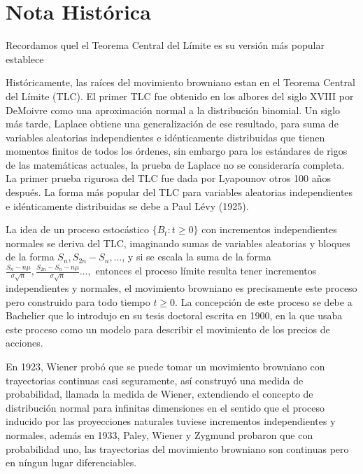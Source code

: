 \documentclass[12pt, letterpaper]{article}
\numberwithin{equation}{section}
\begin{document}

\tableofcontents


\pagebreak
\setcounter{page}{1}

\section{Nota Histórica}

Recordamos quel el Teorema Central del Límite es su versión más popular establece 

Históricamente, las raíces del movimiento browniano estan en el Teorema Central del Límite (TLC). El primer TLC fue obtenido en los albores del siglo XVIII por DeMoivre como una aproximación normal a la distribución binomial. Un siglo más tarde, Laplace obtiene una generalización de ese resultado, para suma de variables aleatorias independientes e idénticamente distribuidas que tienen momentos finitos de todos los órdenes, sin embargo para los estándares de rigos de las matemáticas actuales, la prueba de Laplace no se consideraría completa. La primer prueba rigurosa del TLC fue dada por Lyapounov otros 100 años después. La forma más popular del TLC para variables aleatorias independientes e idénticamente distribuidas se debe a Paul Lévy (1925).

La idea de un proceso estocástico $\{B_t:t\geq 0\}$ con incrementos independientes normales se deriva del TLC, imaginando sumas de variables aleatorias y bloques de la forma $S_n,S_{2n}-S_{n},\dots$, y si se escala la suma de la forma $\frac{S_n-n\mu}{\sigma\sqrt{n}},\frac{S_{2n}-S_n-n\mu}{\sigma\sqrt{n}}\dots,$ entonces el proceso límite resulta tener incrementos independientes y normales, el movimiento browniano es precisamente este proceso pero construido para todo tiempo $t\geq 0$. La concepción de este proceso se debe a Bachelier que lo introdujo en su tesis doctoral escrita en 1900, en la que usaba este proceso como un modelo para describir el movimiento de los precios de acciones. 

En 1923, Wiener probó que se puede tomar un movimiento browniano con trayectorias continuas casi seguramente, así construyó una medida de probabilidad, llamada la medida de Wiener, extendiendo el concepto de distribución normal para infinitas dimensiones en el sentido que el proceso inducido por las proyecciones naturales tuviese incrementos independientes y normales, además en 1933, Paley, Wiener y Zygmund probaron que con probabilidad uno, las trayectorias del movimiento browniano son continuas pero en níngun lugar diferenciables. 
\end{document}
